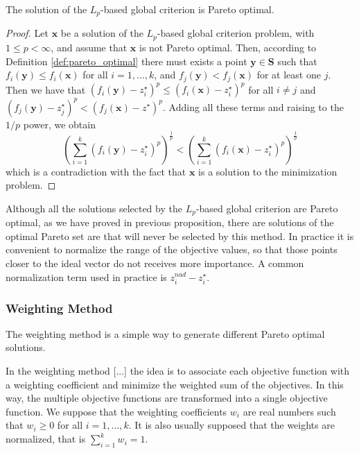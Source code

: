 {\begin{proposition}
\label{prop:global_criterion_pareto_optimal}
The solution of the $L_p$-based global criterion is Pareto optimal.
\end{proposition}
\begin{proof}
Let $\mathbf{x}$ be a solution of the $L_p$-based global criterion problem, with $1 \leq p < \infty$, and assume that $\mathbf{x}$ is not Pareto optimal. Then, according to Definition \ref{def:pareto_optimal} there must exists a point $\mathbf{y} \in \mathbf{S}$ such that $f_i( \mathbf{y} ) \leq f_i( \mathbf{x} )$ for all $i = 1, \ldots, k$, and $f_j( \mathbf{y} ) < f_j( \mathbf{x} )$ for at least one $j$. Then we have that $( f_i(\mathbf{y}) - z_i^\star )^p \leq ( f_i(\mathbf{x}) - z_i^\star )^p$ for all $i \neq j$ and $( f_j(\mathbf{y}) - z_j^\star )^p < ( f_j(\mathbf{x}) - z^\star )^p$. Adding all these terms and raising to the $1/p$ power, we obtain
\[
\left( \sum_{i=1}^k \left( f_i(\mathbf{y}) - z_i^\star \right)^p \right)^{\frac{1}{p}} < \left( \sum_{i=1}^k \left( f_i(\mathbf{x}) - z_i^\star \right)^p \right)^{\frac{1}{p}} 
\]
which is a contradiction with the fact that $\mathbf{x}$ is a solution to the minimization problem.
\end{proof}

Although all the solutions selected by the $L_p$-based global criterion are Pareto optimal, as we have proved in previous proposition, there are solutions of the optimal Pareto set are that will never be selected by this method. In practice it is convenient to normalize the range of the objective values, so that those points closer to the ideal vector do not receives more importance. A common normalization term used in practice is $z_i^{nad} - z_i^\star$.

\subsubsection{Weighting Method}

{\color{red} The weighting method is a simple way to generate different Pareto optimal solutions.}

{\color{red} In the weighting method [...] the idea is to associate each objective function with a weighting coefficient and minimize the weighted sum of the objectives. In this way, the multiple objective functions are transformed into a single objective function. We suppose that the weighting coefficients $w_i$ are real numbers such that $w_i \geq 0$ for all $i = 1, \ldots, k$. It is also usually supposed that the weights are normalized, that is $\sum_{i=1}^k w_i = 1$.}

}
